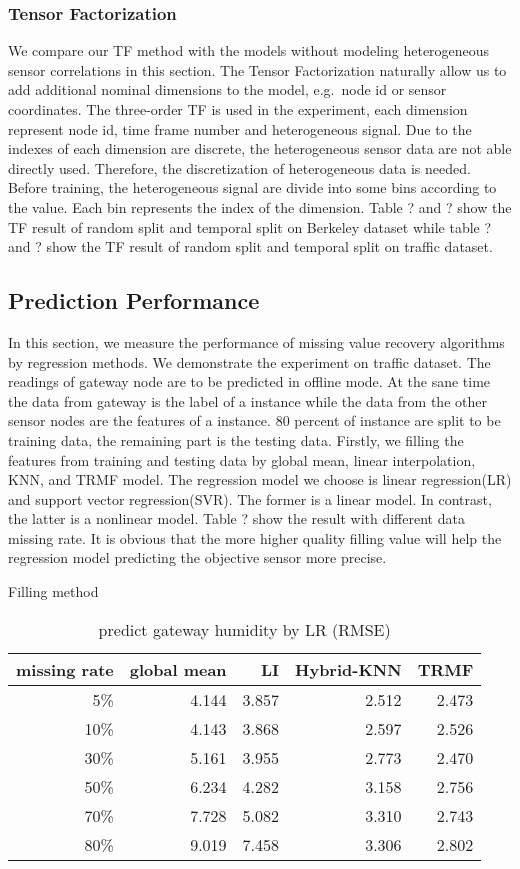\subsubsection{Tensor Factorization} %
We compare our TF method with the models without modeling heterogeneous sensor correlations in this section.
The Tensor Factorization naturally allow us to add additional nominal dimensions to the model, e.g.\ node id or sensor coordinates.
The three-order TF is used in the experiment, each dimension represent node id, time frame number and heterogeneous signal.  
Due to the indexes of each dimension are discrete, the heterogeneous sensor data are not able directly used.
Therefore, the discretization of heterogeneous data is needed.
Before training, the heterogeneous signal are divide into some bins according to the value.
Each bin represents the index of the dimension.
Table ? and ? show the TF result of random split and temporal split on Berkeley dataset while table ? and ? show the TF result of random split and temporal split on traffic dataset.

\subsection{Prediction Performance}
In this section, we measure the performance of missing value recovery algorithms by regression methods.
We demonstrate the experiment on traffic dataset.
The readings of gateway node are to be predicted in offline mode.
At the sane time the data from gateway is the label of a instance while the data from the other sensor nodes are the features of a instance.
80 percent of instance are split to be training data, the remaining part is the testing data.
Firstly, we filling the features from training and testing data by global mean, linear interpolation, KNN, and TRMF model.
The regression model we choose is linear regression(LR) and support vector regression(SVR).
The former is a linear model.
In contrast, the latter is a nonlinear model.
Table ? show the result with different data missing rate.
It is obvious that the more higher quality filling value will help the regression model predicting the objective sensor more precise.

\begin{table} [htbp]
\centering
\caption{predict gateway humidity by LR (RMSE) }
\label{table: LR}
   Filling method
\begin{tabular}{ r | r r r r}
        missing rate&global mean     &LI   &Hybrid-KNN &TRMF\\ \hline
        5\%      &4.144&3.857&2.512&2.473\\
        10\%    &4.143&3.868& 2.597&2.526\\
        30\%    &5.161&3.955&2.773&2.470\\
        50\%    &6.234&4.282&3.158&2.756\\
        70\%   &7.728&5.082&3.310&2.743\\
        80\%   &9.019&7.458&3.306&2.802\\
\end{tabular}
\end{table}

